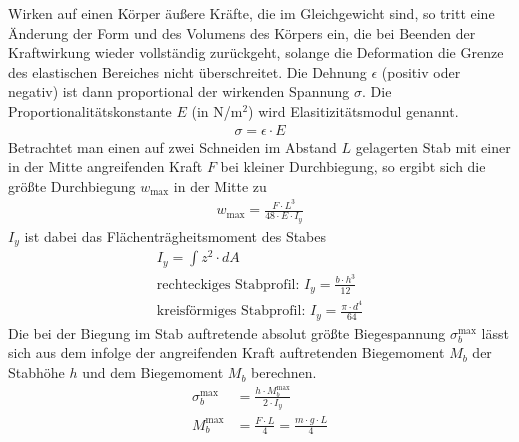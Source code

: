 \documentclass{article}
\begin{document}
Wirken auf einen Körper äußere Kräfte, die im Gleichgewicht sind, so tritt eine Änderung der
Form und des Volumens des Körpers ein, die bei Beenden der Kraftwirkung wieder vollständig
zurückgeht, solange die Deformation die Grenze des elastischen Bereiches nicht überschreitet.
Die Dehnung $\epsilon$ (positiv oder negativ) ist dann proportional der wirkenden Spannung $\sigma$. Die Proportionalitätskonstante $E$ (in N/m${}^2$) wird Elasitizitätsmodul genannt.
\begin{align}
\sigma = \epsilon\cdot E
\end{align}
Betrachtet man einen auf zwei Schneiden im Abstand $L$ gelagerten Stab mit einer in der Mitte angreifenden Kraft $F$ bei kleiner Durchbiegung, so ergibt sich die größte Durchbiegung $w_\text{max}$ in der Mitte zu
\begin{align}
\label{eq:emodul}
w_\text{max} = \frac{F\cdot L^3}{48\cdot E \cdot I_y}
\end{align}
$I_y$ ist dabei das Flächenträgheitsmoment des Stabes
\begin{align}
I_y = \int z^2\cdot dA \\
\text{rechteckiges Stabprofil: } I_y = \frac{b\cdot h^3}{12} \\
\text{kreisförmiges Stabprofil: } I_y = \frac{\pi\cdot d^4}{64} 
\end{align}
Die bei der Biegung im Stab auftretende absolut größte Biegespannung $\sigma_b^{\text{max}}$ lässt sich aus dem infolge der angreifenden Kraft auftretenden Biegemoment $M_b$ der Stabhöhe $h$ und dem Biegemoment $M_b$ berechnen.
\begin{align}
\sigma_b^{\text{max}} &= \frac{h\cdot M_b^\text{max}}{2\cdot I_y} \\
M_b^\text{max} &= \frac{F\cdot L}{4} = \frac{m\cdot g\cdot L}{4}
\end{align}


\newpage





\end{document}
